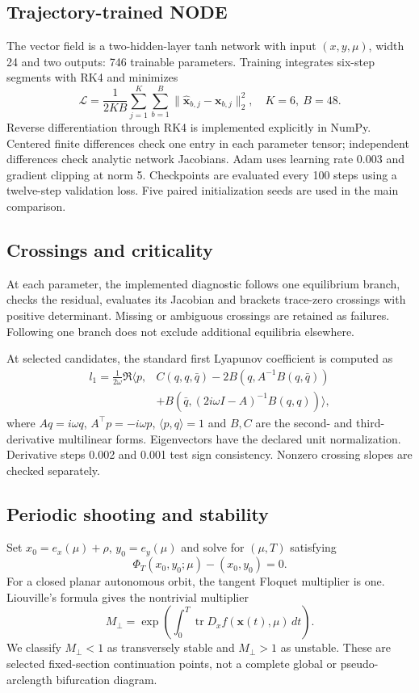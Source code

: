 \documentclass[11pt,a4paper]{article}
\newcommand{\tr}{\operatorname{tr}}
\begin{document}
\subsection{Trajectory-trained NODE}
The vector field is a two-hidden-layer tanh network with input $(x,y,\mu)$, width 24 and two outputs: 746 trainable parameters. Training integrates six-step segments with RK4 and minimizes
\begin{equation}
\mathcal L=\frac{1}{2KB}\sum_{j=1}^{K}\sum_{b=1}^{B}
\|\widehat{\boldsymbol x}_{b,j}-\boldsymbol x_{b,j}\|_2^2,\quad K=6,\ B=48.
\end{equation}
Reverse differentiation through RK4 is implemented explicitly in NumPy. Centered finite differences check one entry in each parameter tensor; independent differences check analytic network Jacobians. Adam uses learning rate 0.003 and gradient clipping at norm 5. Checkpoints are evaluated every 100 steps using a twelve-step validation loss. Five paired initialization seeds are used in the main comparison.

\subsection{Crossings and criticality}
At each parameter, the implemented diagnostic follows one equilibrium branch, checks the residual, evaluates its Jacobian and brackets trace-zero crossings with positive determinant. Missing or ambiguous crossings are retained as failures. Following one branch does not exclude additional equilibria elsewhere.

At selected candidates, the standard first Lyapunov coefficient \cite{kuznetsov} is computed as
\begin{align}
l_1=\frac{1}{2\omega}\Re\langle p,&C(q,q,\bar q)
-2B(q,A^{-1}B(q,\bar q))\nonumber\\
&+B(\bar q,(2i\omega I-A)^{-1}B(q,q))\rangle, \label{eq:l1}
\end{align}
where $Aq=i\omega q$, $A^\top p=-i\omega p$, $\langle p,q\rangle=1$ and $B,C$ are the second- and third-derivative multilinear forms. Eigenvectors have the declared unit normalization. Derivative steps 0.002 and 0.001 test sign consistency. Nonzero crossing slopes are checked separately.

\subsection{Periodic shooting and stability}
Set $x_0=e_x(\mu)+\rho$, $y_0=e_y(\mu)$ and solve for $(\mu,T)$ satisfying
\begin{equation}
\Phi_T(x_0,y_0;\mu)-(x_0,y_0)=0.
\end{equation}
For a closed planar autonomous orbit, the tangent Floquet multiplier is one. Liouville's formula gives the nontrivial multiplier
\begin{equation}
M_\perp=\exp\left(\int_0^T\tr D_xf(\boldsymbol x(t),\mu)\,dt\right).
\end{equation}
We classify $M_\perp<1$ as transversely stable and $M_\perp>1$ as unstable. These are selected fixed-section continuation points, not a complete global or pseudo-arclength bifurcation diagram.
\end{document}
